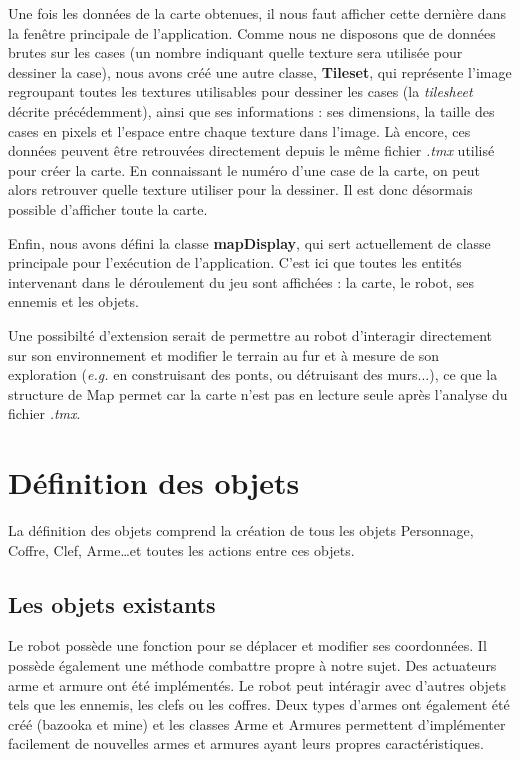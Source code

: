 \documentclass[a4paper 12pts]{article}
\begin{document}
Une fois les données de la carte obtenues, il nous faut afficher cette dernière dans la fenêtre principale de l'application. Comme nous ne disposons que de données brutes sur les cases (un nombre indiquant quelle texture sera utilisée pour dessiner la case), nous avons créé une autre classe, \textbf{Tileset}, qui représente l'image regroupant toutes les textures utilisables pour dessiner les cases (la \emph{tilesheet} décrite précédemment), ainsi que ses informations : ses dimensions, la taille des cases en pixels et l'espace entre chaque texture dans l'image. Là encore, ces données peuvent être retrouvées directement depuis le même fichier \emph{.tmx} utilisé pour créer la carte.
En connaissant le numéro d'une case de la carte, on peut alors retrouver quelle texture utiliser pour la dessiner. Il est donc désormais possible d'afficher toute la carte.

Enfin, nous avons défini la classe \textbf{mapDisplay}, qui sert actuellement de classe principale pour l'exécution de l'application. C'est ici que toutes les entités intervenant dans le déroulement du jeu sont affichées : la carte, le robot, ses ennemis et les objets.

Une possibilté d'extension serait de permettre au robot d'interagir directement sur son environnement et modifier le terrain au fur et à mesure de son exploration (\emph{e.g.} en construisant des ponts, ou détruisant des murs...), ce que la structure de Map permet car la carte n'est pas en lecture seule après l'analyse du fichier \emph{.tmx}. 



\section{Définition des objets}
La définition des objets comprend la création de tous les objets Personnage, Coffre, Clef, Arme\ldots et toutes les actions entre ces objets.

\subsection{Les objets existants}
Le robot possède une fonction pour se déplacer et modifier ses coordonnées. Il possède également une méthode combattre propre à notre sujet. Des actuateurs arme et armure ont été implémentés. Le robot peut intéragir avec d'autres objets tels que les ennemis, les clefs ou les coffres. Deux types d'armes ont également été créé (bazooka et mine) et les classes Arme et Armures permettent d'implémenter facilement de nouvelles armes et armures ayant leurs propres caractéristiques.
\end{document}
